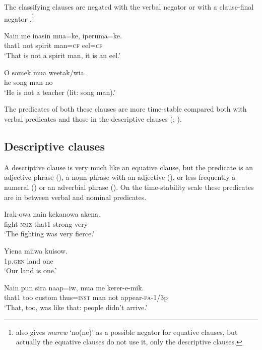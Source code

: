 The classifying clauses are negated with the verbal negator  or with a clause-final negator .\footnote{\citet[272]{Berghall2006} also gives \textit{marew} `no(ne)' as a possible negator for equative clauses, but actually the equative clauses do not use it, only the descriptive clauses.} 

\ea%
\label{ex:x980}
\gll Nain  me  inasin  mua=ke,  iperuma=ke. \\
     that1  not  spirit  man=\textsc{cf}  eel=\textsc{cf} \\
\glt `That is not a spirit man, it is an eel.'
\z

\ea%
\label{ex:x984}
\gll O  somek  mua  weetak/wia. \\
     he  song  man  no \\
\glt `He is not a teacher (lit: song man).' 
\z

The predicates of both these clauses are more time-stable compared both with verbal predicates and those in the descriptive clauses (\citealt[51]{Givon1984}; \citealt[16]{Stassen1997}). 

\subsection{Descriptive clauses}
{}
A descriptive clause is very much like an equative clause, but the predicate is an adjective phrase (), a noun phrase with an adjective (), or less frequently a numeral () or an adverbial phrase (). On the time-stability scale these predicates are in between verbal and nominal predicates. 

\ea%
\label{ex:x974}
\gll Irak-owa  nain  kekanowa  akena. \\
     fight-\textsc{nmz}  that1  strong  very \\
\glt `The fighting was very fierce.'
\z

\ea%
\label{ex:x979}
\gll Yiena  miiwa  kuisow. \\
     1p.\textsc{gen}  land  one \\
\glt `Our land is one.'
\z

\ea%
\label{ex:x985}
\gll Nain  pun  sira  naap=iw,  mua  me  kerer-e-mik. \\
     that1  too  custom  thus=\textsc{inst}  man  not  appear-\textsc{pa}-1/3p \\
\glt `That, too, was like that: people didn't arrive.'
\z

